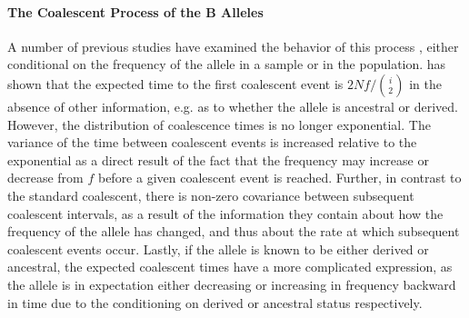 \documentclass[a4paper,10pt]{article}
\newcommand{\fancyN}{$\mathcal N$ }
\newcommand{\fancyB}{$\mathcal B$ }
\begin{document}

\paragraph{The Coalescent Process of the B Alleles}


A number of previous studies have examined the behavior of this process \citep{Wiuf1999,Wiuf:2000js,Patterson2005}, either conditional on the frequency of the allele in a sample or in the population. \cite{Wiuf:2000js} has shown that the expected time to the first coalescent event is $2 N f/ {i \choose 2}$ in the absence of other information, e.g. as to whether the allele is ancestral or derived. However, the distribution of coalescence times is no longer exponential. The variance of the time between coalescent events is increased relative to the exponential as a direct result of the fact that the frequency may increase or decrease from $f$ before a given coalescent event is reached. Further, in contrast to the standard coalescent, there is non-zero covariance between subsequent coalescent intervals, as a result of the information they contain about how the frequency of the allele has changed, and thus about the rate at which subsequent coalescent events occur. Lastly, if the allele is known to be either derived or ancestral, the expected coalescent times have a more complicated expression, as the allele is in expectation either decreasing or increasing in frequency backward in time due to the conditioning on derived or ancestral status respectively.
\end{document}
